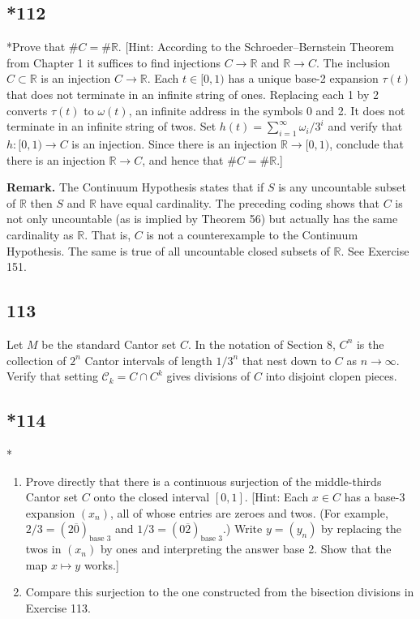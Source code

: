 \documentclass{amsart}
\begin{document}
\subsection*{*112}
*Prove that $\#C = \#\mathbb{R}$. [Hint: According to the Schroeder--Bernstein Theorem from Chapter 1 it suffices to find injections $C \to \mathbb{R}$ and $\mathbb{R} \to C$. The inclusion $C \subset \mathbb{R}$ is an injection $C \to \mathbb{R}$. Each $t \in [0,1)$ has a unique base-2 expansion $\tau(t)$ that does not terminate in an infinite string of ones. Replacing each 1 by 2 converts $\tau(t)$ to $\omega(t)$, an infinite address in the symbols 0 and 2. It does not terminate in an infinite string of twos. Set $h(t) = \sum_{i=1}^\infty \omega_i/3^i$ and verify that $h : [0,1) \to C$ is an injection. Since there is an injection $\mathbb{R} \to [0,1)$, conclude that there is an injection $\mathbb{R} \to C$, and hence that $\#C = \#\mathbb{R}$.]

\textbf{Remark.} The Continuum Hypothesis states that if $S$ is any uncountable subset of $\mathbb{R}$ then $S$ and $\mathbb{R}$ have equal cardinality. The preceding coding shows that $C$ is not only uncountable (as is implied by Theorem 56) but actually has the same cardinality as $\mathbb{R}$. That is, $C$ is not a counterexample to the Continuum Hypothesis. The same is true of all uncountable closed subsets of $\mathbb{R}$. See Exercise 151.

\subsection*{113}
Let $M$ be the standard Cantor set $C$. In the notation of Section 8, $C^n$ is the collection of $2^n$ Cantor intervals of length $1/3^n$ that nest down to $C$ as $n \to \infty$. Verify that setting $\mathcal{C}_k = C \cap C^k$ gives divisions of $C$ into disjoint clopen pieces.

\subsection*{*114}
*
\begin{enumerate}[label=(\alph*)]
\item Prove directly that there is a continuous surjection of the middle-thirds Cantor set $C$ onto the closed interval $[0,1]$. [Hint: Each $x \in C$ has a base-3 expansion $(x_n)$, all of whose entries are zeroes and twos. (For example, $2/3 = (2\overline{0})_{\text{base }3}$ and $1/3 = (0\overline{2})_{\text{base }3}$.) Write $y = (y_n)$ by replacing the twos in $(x_n)$ by ones and interpreting the answer base 2. Show that the map $x \mapsto y$ works.]
\item Compare this surjection to the one constructed from the bisection divisions in Exercise 113.
\end{enumerate}
\end{document}

